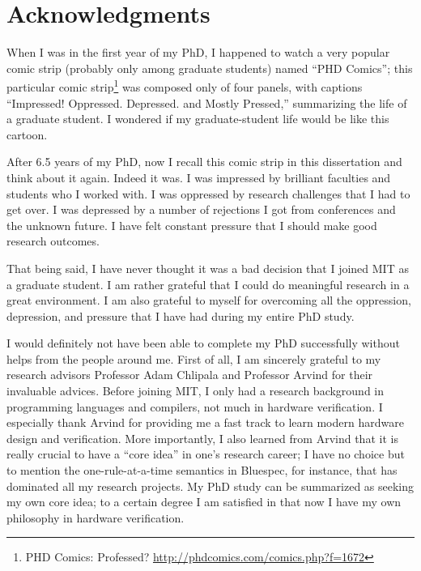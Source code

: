 % 

\cleardoublepage

\section*{Acknowledgments}

When I was in the first year of my PhD, I happened to watch a very popular comic strip (probably only among graduate students) named ``PHD Comics''; this particular comic strip\footnote{PHD Comics: Professed? \url{http://phdcomics.com/comics.php?f=1672}} was composed only of four panels, with captions ``Impressed! Oppressed. Depressed. and Mostly Pressed,'' summarizing the life of a graduate student.
I wondered if my graduate-student life would be like this cartoon.

After 6.5 years of my PhD, now I recall this comic strip in this dissertation and think about it again.
Indeed it was.
I was impressed by brilliant faculties and students who I worked with.
I was oppressed by research challenges that I had to get over.
I was depressed by a number of rejections I got from conferences and the unknown future.
I have felt constant pressure that I should make good research outcomes.

That being said, I have never thought it was a bad decision that I joined MIT as a graduate student.
I am rather grateful that I could do meaningful research in a great environment.
I am also grateful to myself for overcoming all the oppression, depression, and pressure that I have had during my entire PhD study.

I would definitely not have been able to complete my PhD successfully without helps from the people around me.
First of all, I am sincerely grateful to my research advisors Professor Adam Chlipala and Professor Arvind for their invaluable advices.
Before joining MIT, I only had a research background in programming languages and compilers, not much in hardware verification.
I especially thank Arvind for providing me a fast track to learn modern hardware design and verification.
More importantly, I also learned from Arvind that it is really crucial to have a ``core idea'' in one's research career; I have no choice but to mention the one-rule-at-a-time semantics in Bluespec, for instance, that has dominated all my research projects.
My PhD study can be summarized as seeking my own core idea; to a certain degree I am satisfied in that now I have my own philosophy in hardware verification.


